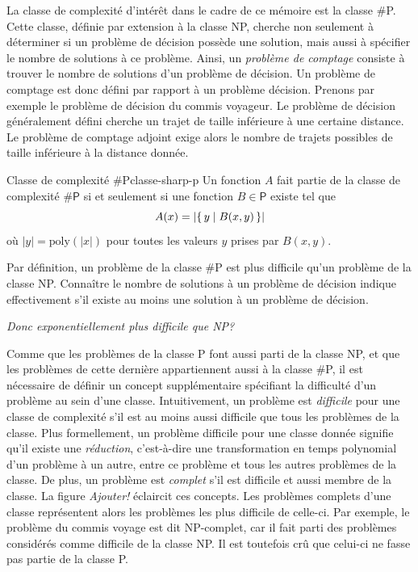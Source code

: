 La classe de complexité d'intérêt dans le cadre de ce mémoire est la classe \textsf{\#P}. Cette classe, définie par extension à la classe \textsf{NP}, cherche non seulement à déterminer si un problème de décision possède une solution, mais aussi à spécifier le nombre de solutions à ce problème. Ainsi, un \textit{problème de comptage} consiste à trouver le nombre de solutions d'un problème de décision. Un problème de comptage est donc défini par rapport à un problème décision. Prenons par exemple le problème de décision du commis voyageur. Le problème de décision généralement défini cherche un trajet de taille inférieure à une certaine distance. Le problème de comptage adjoint exige alors le nombre de trajets possibles de taille inférieure à la distance donnée. 

\begin{maindefinition}{Classe de complexité \textsf{\#P}}{classe-sharp-p}
    Un fonction $A$ fait partie de la classe de complexité $\textsf{\#P}$ si et seulement si une fonction $B \in \textsf{P}$ existe tel que
    \begin{equation*}
        A(x) = \lvert \set{ y \mid B(x, y)} \rvert
    \end{equation*}
    où $\lvert y \rvert = \mathrm{poly}(\lvert x \rvert)$ pour toutes les valeurs $y$ prises par $B(x,y)$.
\end{maindefinition}

Par définition, un problème de la classe \textsf{\#P} est plus difficile qu'un problème de la classe \textsf{NP}. Connaître le nombre de solutions à un problème de décision indique effectivement s'il existe au moins une solution à un problème de décision.

\textcolor{mydarkred}{\textit{Donc exponentiellement plus difficile que NP?}}

Comme que les problèmes de la classe \textsf{P} font aussi parti de la classe \textsf{NP}, et que les problèmes de cette dernière appartiennent aussi à la classe \textsf{\#P}, il est nécessaire de définir un concept supplémentaire spécifiant la difficulté d'un problème au sein d'une classe. Intuitivement, un problème est \textit{difficile} pour une classe de complexité s'il est au moins aussi difficile que tous les problèmes de la classe. Plus formellement, un problème difficile pour une classe donnée signifie qu'il existe une \textit{réduction}, c'est-à-dire une transformation en temps polynomial d'un problème à un autre, entre ce problème et tous les autres problèmes de la classe. De plus, un problème est \textit{complet} s'il est difficile et aussi membre de la classe. La figure \textcolor{mydarkred}{\textit{Ajouter!}} éclaircit ces concepts. Les problèmes complets d'une classe représentent alors les problèmes les plus difficile de celle-ci. Par exemple, le problème du commis voyage est dit \textsf{NP}-complet, car il fait parti des problèmes considérés comme difficile de la classe \textsf{NP}. Il est toutefois crû que celui-ci ne fasse pas partie de la classe \textsf{P}.

